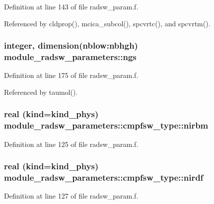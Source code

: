 Definition at line 143 of file radsw\+\_\+param.\+f.



Referenced by cldprop(), mcica\+\_\+subcol(), spcvrtc(), and spcvrtm().

\subsubsection[{\texorpdfstring{ngs}{ngs}}]{\setlength{\rightskip}{0pt plus 5cm}integer, dimension(nblow\+:nbhgh) module\+\_\+radsw\+\_\+parameters\+::ngs}\hypertarget{group__module__radsw__main_ga715ab3195493dff0639da443c21e4fb5}{}\label{group__module__radsw__main_ga715ab3195493dff0639da443c21e4fb5}


Definition at line 175 of file radsw\+\_\+param.\+f.



Referenced by taumol().

\subsubsection[{\texorpdfstring{nirbm}{nirbm}}]{\setlength{\rightskip}{0pt plus 5cm}real (kind=kind\+\_\+phys) module\+\_\+radsw\+\_\+parameters\+::cmpfsw\+\_\+type\+::nirbm}\hypertarget{group__module__radsw__main_gaae8070f9f477bf036071ccc7d707693d}{}\label{group__module__radsw__main_gaae8070f9f477bf036071ccc7d707693d}


Definition at line 125 of file radsw\+\_\+param.\+f.

\subsubsection[{\texorpdfstring{nirdf}{nirdf}}]{\setlength{\rightskip}{0pt plus 5cm}real (kind=kind\+\_\+phys) module\+\_\+radsw\+\_\+parameters\+::cmpfsw\+\_\+type\+::nirdf}\hypertarget{group__module__radsw__main_ga9944f87ce40eb678e3ca1d88b1dbb797}{}\label{group__module__radsw__main_ga9944f87ce40eb678e3ca1d88b1dbb797}


Definition at line 127 of file radsw\+\_\+param.\+f.

